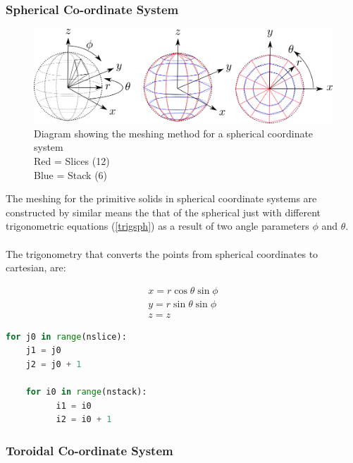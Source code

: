 \documentclass[12pt,a4paper]{article}
\begin{document}
\subsubsection{Spherical Co-ordinate System}

\begin{figure}[h!]
\centering
\includegraphics[scale=0.5]{Images//Coords//sph.png}
\caption[width=\columnwidth]{Diagram showing the meshing method for a spherical coordinate system\\
Red = Slices (12)\\
Blue = Stack (6)}
\label{sphmeshin}
\end{figure}

The meshing for the primitive solids in spherical coordinate systems are constructed by similar means the that of the spherical just with different trigonometric equations (\ref{trigsph}) as a result of two angle parameters $\phi$ and $\theta$. 
\\\\
The trigonometry that converts the points from spherical coordinates to cartesian, are:

\begin{equation}
\begin{split}
x = r \cos{\theta}\sin{\phi}\\
y = r \sin{\theta}\sin{\phi} \\
z = z
\end{split}
\label{trigsph}
\end{equation}

\begin{lstlisting}[language=Python, caption=Python example]
for j0 in range(nslice):
    j1 = j0
    j2 = j0 + 1

    for i0 in range(nstack):
          i1 = i0
          i2 = i0 + 1
\end{lstlisting}



\subsubsection{Toroidal Co-ordinate System}
\end{document}
